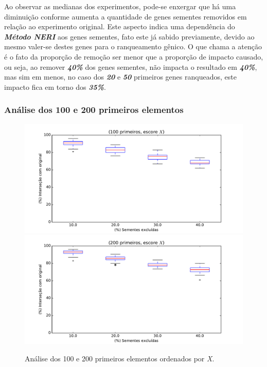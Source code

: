 Ao observar as medianas dos experimentos, pode-se enxergar que há uma diminuição conforme aumenta a quantidade de genes sementes removidos em relação ao experimento original. Este aspecto indica uma dependência do \textsl{\textbf{Método NERI}} aos genes sementes, fato este já sabido previamente, devido ao mesmo valer-se destes genes para o ranqueamento gênico. O que chama a atenção é o fato da proporção de remoção ser menor que a proporção de impacto causado, ou seja, ao remover \textsl{\textbf{40\%}} dos genes sementes, não impacta o resultado em \textsl{\textbf{40\%}}, mas sim em menos, no caso dos \textsl{\textbf{20}} e \textsl{\textbf{50}} primeiros genes ranqueados, este impacto fica em torno dos \textsl{\textbf{35\%}}.



%
\subsubsection{Análise dos 100 e 200 primeiros elementos}
%
\begin{figure}[ht!]
\includegraphics[width=1\textwidth]{Images/analyses/fig_X_100_40.pdf}
\includegraphics[width=1\textwidth]{Images/analyses/fig_X_200_40.pdf}
\caption {Análise dos 100 e 200 primeiros elementos ordenados por \textit{X}.
\label{fig_X_100-200_40}}
\end{figure}
%

